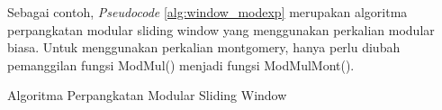     Sebagai contoh, \textit{Pseudocode} \ref{alg:window_modexp} merupakan algoritma perpangkatan modular sliding window yang menggunakan perkalian modular biasa. Untuk menggunakan perkalian montgomery, hanya perlu diubah pemanggilan fungsi ModMul() menjadi fungsi ModMulMont().

    \begin{algorithm}
      \caption{Algoritma Perpangkatan Modular Sliding Window}
      \label{alg:window_modexp}
      \begin{algorithmic}[1]
        \Statex

        \State {}
            \EndFor
        \EndFor
        \State {}
        \EndFunction
      \end{algorithmic}
    \end{algorithm}
